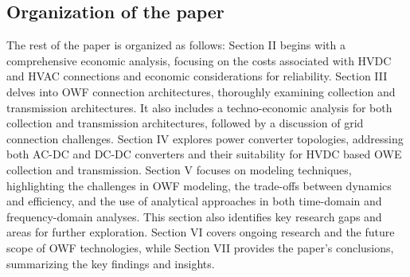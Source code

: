 \documentclass{ieeeaccess}
\begin{document}
 \subsection{\textbf{Organization of the paper}}
 The rest of the paper is organized as follows: Section II begins with a comprehensive economic analysis, focusing on the costs associated with HVDC and HVAC connections and economic considerations for reliability. 
 Section III delves into OWF connection architectures, thoroughly examining collection and transmission architectures. 
 It also includes a techno-economic analysis for both collection and transmission architectures, followed by a discussion of grid connection challenges. 
 Section IV explores power converter topologies, addressing both AC-DC and DC-DC converters and their suitability for HVDC based OWE collection and transmission. 
 Section V focuses on modeling techniques, highlighting the challenges in OWF modeling, the trade-offs between dynamics and efficiency, and the use of analytical approaches in both time-domain and frequency-domain analyses.
 This section also identifies key research gaps and areas for further exploration. 
 Section VI covers ongoing research and the future scope of OWF technologies, while Section VII provides the paper's conclusions, summarizing the key findings and insights.
\end{document}
